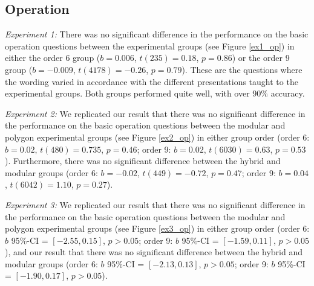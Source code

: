 \documentclass[man,mask,10pt]{apa6}
\begin{document}
\subsection{Operation}
\textit{Experiment 1:} There was no significant difference in the performance on the basic operation questions between the experimental groups (see Figure \ref{ex1_op}) in either the order 6 group ($b = 0.006$, $t(235) = 0.18$, $p = 0.86$) or the order 9 group ($b = -0.009$, $t(4178) = -0.26$, $p = 0.79$). These are the questions where the wording varied in accordance with the different presentations taught to the experimental groups. Both groups performed quite well, with over 90\% accuracy. \par 
\textit{Experiment 2:} We replicated our result that there was no significant difference in the performance on the basic operation questions between the modular and polygon experimental groups (see Figure \ref{ex2_op}) in either group order (order 6: $b = 0.02$, $t(480) = 0.735$, $p = 0.46$; order 9: $b = 0.02$, $t(6030) = 0.63$, $p = 0.53$). Furthermore, there was no significant difference between the hybrid and modular groups (order 6: $b = -0.02$, $t(449) = -0.72$, $p = 0.47$; order 9: $b = 0.04$, $t(6042) = 1.10$, $p = 0.27$).\par
\textit{Experiment 3:} We replicated our result that there was no significant difference in the performance on the basic operation questions between the modular and polygon experimental groups (see Figure \ref{ex3_op}) in either group order (order 6: $b$ 95\%-CI = $[-2.55,0.15]$, $p > 0.05$; order 9: $b$ 95\%-CI = $[-1.59,0.11]$, $p > 0.05$), and our result that there was no significant difference between the hybrid and modular groups (order 6:  $b$ 95\%-CI = $[-2.13,0.13]$, $p > 0.05$; order 9: $b$ 95\%-CI = $[-1.90,0.17]$, $p > 0.05$). \par
\end{document}

